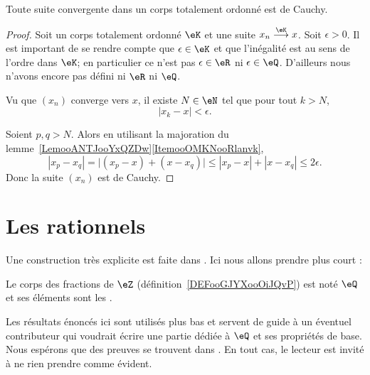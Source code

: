 \begin{proposition}     \label{PROPooTFVOooFoSHPg}
    Toute suite convergente dans un corps totalement ordonné est de Cauchy.
\end{proposition}

\begin{proof}
    Soit un corps totalement ordonné \( \eK\) et une suite \( x_n\stackrel{\eK}{\longrightarrow}x\). Soit \( \epsilon>0\). Il est important de se rendre compte que \( \epsilon\in \eK\) et que l'inégalité est au sens de l'ordre dans \( \eK\); en particulier ce n'est pas \( \epsilon\in \eR\) ni \( \epsilon\in \eQ\). D'ailleurs nous n'avons encore pas défini ni \( \eR\) ni \( \eQ\).

    Vu que \( (x_n)\) converge vers \( x\), il existe \( N\in \eN\) tel que pour tout \( k>N\),
    \begin{equation}
        | x_k-x |<\epsilon.
    \end{equation}

    Soient \( p,q>N\). Alors en utilisant la majoration du lemme~\ref{LemooANTJooYxQZDw}\ref{ItemooOMKNooRlanvk},
    \begin{equation}
        | x_p-x_q |=\big| (x_p-x)+(x-x_q) \big|\leq | x_p-x |+| x-x_q |\leq 2\epsilon.
    \end{equation}
    Donc la suite \( (x_n)\) est de Cauchy.
\end{proof}

\section{Les rationnels}

Une construction très explicite est faite dans \cite{RWWJooJdjxEK}. Ici nous allons prendre plus court :
\begin{definition}
    Le corps des fractions de \( \eZ\) (définition~\ref{DEFooGJYXooOiJQvP}) est noté \( \eQ\) et ses éléments sont les .
\end{definition}

Les résultats énoncés ici sont utilisés plus bas et servent de guide à un éventuel contributeur qui voudrait écrire une partie dédiée à \( \eQ\) et ses propriétés de base. Nous espérons que des preuves se trouvent dans \cite{RWWJooJdjxEK}. En tout cas, le lecteur est invité à ne rien prendre comme évident.

